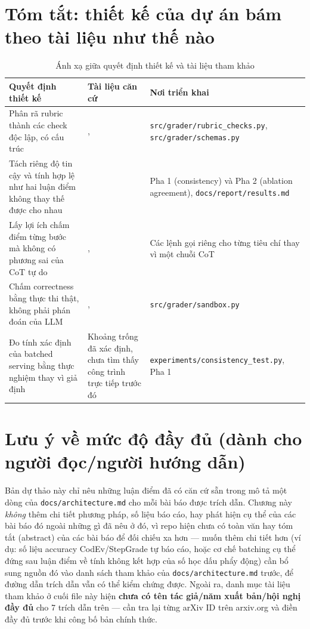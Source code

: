 \documentclass[a4paper,12pt]{report}
\begin{document}
\section{Tóm tắt: thiết kế của dự án bám theo tài liệu như thế nào}

\begin{table}[h]
\centering
\begin{tabular}{p{4cm}p{4cm}p{5cm}}
\toprule
\textbf{Quyết định thiết kế} & \textbf{Tài liệu căn cứ} & \textbf{Nơi triển khai} \\
\midrule
Phân rã rubric thành các check độc lập, có cấu trúc &
  \cite{survey_llm_judge}, \cite{rubric_decomposition} &
  \texttt{src/grader/rubric\_checks.py}, \texttt{src/grader/schemas.py} \\
Tách riêng độ tin cậy và tính hợp lệ như hai luận điểm không thay thế
  được cho nhau &
  \cite{reliability_without_validity} &
  Pha 1 (consistency) và Pha 2 (ablation agreement),
  \texttt{docs/report/results.md} \\
Lấy lợi ích chấm điểm từng bước mà không có phương sai của CoT tự do &
  \cite{codev}, \cite{stepgrade} &
  Các lệnh gọi riêng cho từng tiêu chí thay vì một chuỗi CoT \\
Chấm correctness bằng thực thi thật, không phải phán đoán của LLM &
  \cite{autograding_test_suites}, \cite{multi_lang_sandbox} &
  \texttt{src/grader/sandbox.py} \\
Đo tính xác định của batched serving bằng thực nghiệm thay vì giả định &
  Khoảng trống đã xác định, chưa tìm thấy công trình trực tiếp trước đó &
  \texttt{experiments/consistency\_test.py}, Pha 1 \\
\bottomrule
\end{tabular}
\caption{Ánh xạ giữa quyết định thiết kế và tài liệu tham khảo}
\end{table}

\section{Lưu ý về mức độ đầy đủ (dành cho người đọc/người hướng dẫn)}

Bản dự thảo này chỉ nêu những luận điểm đã có căn cứ sẵn trong mô tả một
dòng của \texttt{docs/architecture.md} cho mỗi bài báo được trích dẫn.
Chương này \emph{không} thêm chi tiết phương pháp, số liệu báo cáo, hay
phát hiện cụ thể của các bài báo đó ngoài những gì đã nêu ở đó, vì repo
hiện chưa có toàn văn hay tóm tắt (abstract) của các bài báo để đối chiếu
xa hơn — muốn thêm chi tiết hơn (ví dụ: số liệu accuracy CodEv/StepGrade tự
báo cáo, hoặc cơ chế batching cụ thể đứng sau luận điểm về tính không kết
hợp của số học dấu phẩy động) cần bổ sung nguồn đó vào danh sách tham khảo
của \texttt{docs/architecture.md} trước, để đường dẫn trích dẫn vẫn có thể
kiểm chứng được. Ngoài ra, danh mục tài liệu tham khảo ở cuối file này hiện
\textbf{chưa có tên tác giả/năm xuất bản/hội nghị đầy đủ} cho 7 trích dẫn
trên — cần tra lại từng arXiv ID trên arxiv.org và điền đầy đủ trước khi
công bố bản chính thức.
\end{document}

